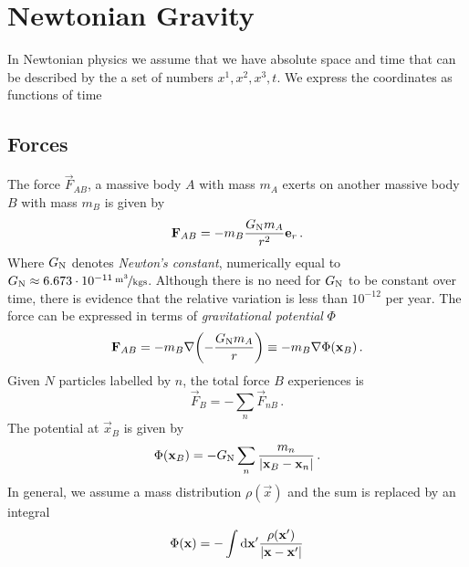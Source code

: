 \chapter{Newtonian Gravity}
In Newtonian physics we assume that we have absolute space and time that can be described by the a set of numbers $x^1,x^2,x^3,t$. We express the coordinates as functions of time
\section{Forces}
The force $\vec{F}_{AB}$, a massive body $A$ with mass $m_A$ exerts on another massive body $B$ with mass $m_B$ is given by
\begin{equation}
    \vec{F}_{AB}=-m_B\frac{G\textsubscript{N}m_A}{r^2}\vec{e}_r\, .
\end{equation}
Where $G\textsubscript{N}$ denotes \emph{Newton's constant}, numerically equal
to $G\textsubscript{N}\approx \unitfrac[6.673\cdot 10^{-11}]{m^3}{kgs}$. 
Although there is no need for $G\textsubscript{N}$ to be constant over time, 
there is evidence that the relative variation is less than $10^{-12}$ per year. 
The force can be expressed in terms of \emph{gravitational potential} $\Phi$
\begin{equation}
    \vec{F}_{AB}=-m_B\nabla\left(-\frac{G\textsubscript{N}m_A}{r}\right)\equiv -m_B\nabla\Phi(\vec{x}_B)\, .
\end{equation}
Given $N$ particles labelled by $n$, the total force $B$ experiences is
\begin{equation}
    \vec{F}_{B}=-\sum_n \vec{F}_{nB}\, .
\end{equation}
The potential at $\vec{x}_B$ is given by
\begin{equation}
    \Phi(\vec{x}_B)=-G\textsubscript{N}\sum_n\frac{m_n}{|\vec{x}_B-\vec{x}_n|}\, .
\end{equation}
In general, we assume a mass distribution $\rho(\vec{x})$ and the sum is replaced by an integral
\begin{equation}
    \Phi(\vec{x})=-\int\dif{\vec{x}^{\prime}}\frac{\rho(\vec{x}^{\prime})}{|\vec{x}-\vec{x}^{\prime}|}
\end{equation}
